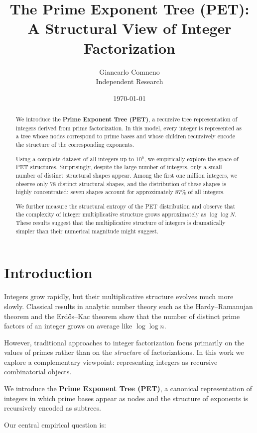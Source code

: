 \documentclass[11pt]{article}
\title{The Prime Exponent Tree (PET): \\
A Structural View of Integer Factorization}
\author{Giancarlo Comneno \\
\small Independent Research}
\date{\today}
\begin{document}
\maketitle

\begin{abstract}
We introduce the \textbf{Prime Exponent Tree (PET)}, a recursive tree representation
of integers derived from prime factorization. In this model, every integer is
represented as a tree whose nodes correspond to prime bases and whose children
recursively encode the structure of the corresponding exponents.

Using a complete dataset of all integers up to $10^6$, we empirically explore the
space of PET structures. Surprisingly, despite the large number of integers,
only a small number of distinct structural shapes appear. Among the first one
million integers, we observe only 78 distinct structural shapes, and the
distribution of these shapes is highly concentrated: seven shapes account for
approximately 87\% of all integers.

We further measure the structural entropy of the PET distribution and observe
that the complexity of integer multiplicative structure grows approximately as
$\log\log N$. These results suggest that the multiplicative structure of integers
is dramatically simpler than their numerical magnitude might suggest.
\end{abstract}

\section{Introduction}

Integers grow rapidly, but their multiplicative structure evolves much more
slowly. Classical results in analytic number theory such as the
Hardy--Ramanujan theorem and the Erd\H{o}s--Kac theorem show that the number
of distinct prime factors of an integer grows on average like $\log\log n$.

However, traditional approaches to integer factorization focus primarily on the
values of primes rather than on the \emph{structure} of factorizations.
In this work we explore a complementary viewpoint: representing integers as
recursive combinatorial objects.

We introduce the \textbf{Prime Exponent Tree (PET)}, a canonical representation
of integers in which prime bases appear as nodes and the structure of exponents
is recursively encoded as subtrees.

Our central empirical question is:
\end{document}
